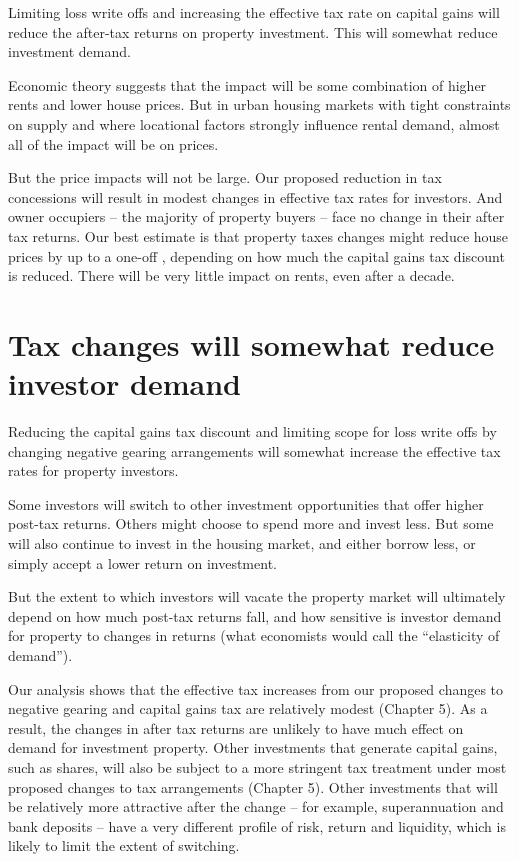 \documentclass{grattan}\usepackage[]{graphicx}\usepackage[]{color}
\begin{document}
Limiting loss write offs and increasing the effective tax rate on capital gains will reduce the after-tax returns on property investment. This will somewhat reduce investment demand. 

Economic theory suggests that the impact will be some combination of higher rents and lower house prices. But in urban housing markets with tight constraints on supply and where locational factors strongly influence rental demand, almost all of the impact will be on prices.  

But the price impacts will not be large. Our proposed reduction in tax concessions will result in modest changes in effective tax rates for investors. And owner occupiers -- the majority of property buyers -- face no change in their after tax returns. Our best estimate is that property taxes changes might reduce house prices by up to a one-off , depending on how much the capital gains tax discount is reduced. There will be very little impact on rents, even after a decade.

\section{Tax changes will somewhat reduce investor demand}
Reducing the capital gains tax discount and limiting scope for loss write offs by changing negative gearing arrangements will somewhat increase the effective tax rates for property investors. 

Some investors will switch to other investment opportunities that offer higher post-tax returns. Others might choose to spend more and invest less. But some will also continue to invest in the housing market, and either borrow less, or simply accept a lower return on investment.

But the extent to which investors will vacate the property market will ultimately depend on how much post-tax returns fall, and how sensitive is investor demand for property to changes in returns (what economists would call the ``elasticity of demand”).

Our analysis shows that the effective tax increases from our proposed changes to negative gearing and capital gains tax are relatively modest (Chapter 5). 
As a result, the changes in after tax returns are unlikely to have much effect on demand for investment property. Other investments that generate capital gains, such as shares, will also be subject to a more stringent tax treatment under most proposed changes to tax arrangements (Chapter 5). Other investments that will be relatively more attractive after the change -- for example, superannuation and bank deposits -- have a very different profile of risk, return and liquidity, which is likely to limit the extent of switching. 
\end{document}
